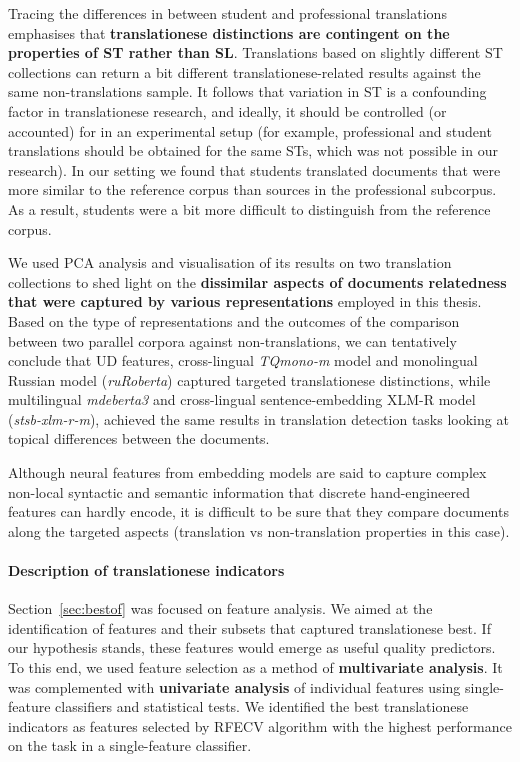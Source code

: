 Tracing the differences in between student and professional translations emphasises that \textbf{translationese distinctions are contingent on the properties of ST rather than SL}. Translations based on slightly different ST collections can return a bit different translationese-related results against the same non-translations sample. It follows that variation in ST is a confounding factor in translationese research, and ideally, it should be controlled (or accounted) for in an experimental setup (for example, professional and student translations should be obtained for the same STs, which was not possible in our research). 
In our setting we found that students translated documents that were more similar to the reference corpus than sources in the professional subcorpus. As a result, students were a bit more difficult to distinguish from the reference corpus. 

We used PCA analysis and visualisation of its results on two translation collections to shed light on the \textbf{dissimilar aspects of documents relatedness that were captured by various representations} employed in this thesis. 
Based on the type of representations and the outcomes of the comparison between two parallel corpora against non-translations, we can tentatively conclude that UD features, cross-lingual \textit{TQmono-m} model and monolingual Russian model (\textit{ruRoberta}) captured targeted translationese distinctions, while multilingual \textit{mdeberta3} and cross-lingual sentence-embedding XLM-R model (\textit{stsb-xlm-r-m}), achieved the same results in translation detection tasks looking at topical differences between the documents.
  
Although neural features from embedding models are said to capture complex non-local syntactic and semantic information that discrete hand-engineered features can hardly encode, it is difficult to be sure that they compare documents along the targeted aspects (translation vs non-translation properties in this case).

\paragraph{Description of translationese indicators}
Section~\ref{sec:bestof} was focused on feature analysis. We aimed at the identification of features and their subsets that captured translationese best. If our hypothesis stands, these features would emerge as useful quality predictors.
To this end, we used feature selection as a method of \textbf{multivariate analysis}. It was complemented with \textbf{univariate analysis} of individual features using single-feature classifiers and statistical tests. We identified the best translationese indicators as features selected by RFECV algorithm with the highest performance on the task in a single-feature classifier. 

